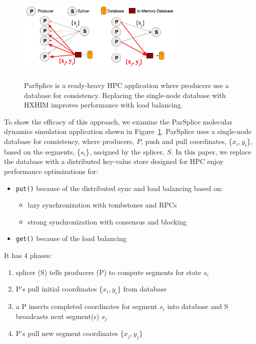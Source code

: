 \begin{figure}[t]
  \noindent\includegraphics[width=19pc,angle=0]{figures/arch-parsplice.png}\\
  \caption{ParSplice is a ready-heavy HPC application where producers use a
  database for consistency. Replacing the single-node database with HXHIM
  improves performance with load balancing.
  \label{fig:arch-parsplice}}
\end{figure}

To show the efficacy of this approach, we examine the ParSplice molecular
dynamics simulation application shown in Figure~\ref{fig:arch-parsplice}.
ParSplice uses a single-node database for consistency, where producers, \(P\),
push and pull coordinates, \{\(x_i, y_i\)\}, based on the segments,
\{\(s_i\)\}, assigned by the splicer, \(S\). In this paper, we replace the
database with a distributed key-value store designed for HPC enjoy performance
optimizations for:

\begin{itemize}
  \item \texttt{put()} because of the distributed sync and load balancing based on:
  \begin{itemize}
    \item lazy synchronization with tombstones and RPCs
    \item strong synchronization with consensus and blocking
  \end{itemize}
  \item \texttt{get()} because of the load balancing
\end{itemize}

It has 4 phases:

\begin{enumerate}

  \item splicer (S) tells producers (P) to compute segments for state \(s_i\)

  \item P's pull initial coordinates \{\(x_i, y_i\)\} from database

  \item a P inserts completed coordinates for segment \(s_i\) into database and
  S broadcasts next segment(s) \(s_j\) 

  \item P's pull new segment coordinates \{\(x_j, y_j\)\}
\end{enumerate}

